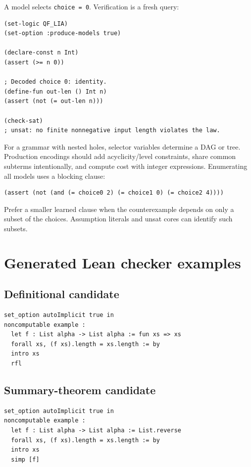 \documentclass[11pt,oneside]{article}
\newcommand{\code}[1]{\texttt{#1}}
\begin{document}
A model selects \code{choice = 0}. Verification is a fresh query:

\begin{lstlisting}[language=SMTLIB,caption={Universal verification as counterexample search}]
(set-logic QF_LIA)
(set-option :produce-models true)

(declare-const n Int)
(assert (>= n 0))

; Decoded choice 0: identity.
(define-fun out-len () Int n)
(assert (not (= out-len n)))

(check-sat)
; unsat: no finite nonnegative input length violates the law.
\end{lstlisting}

For a grammar with nested holes, selector variables determine a DAG or tree. Production
encodings should add acyclicity/level constraints, share common subterms intentionally,
and compute cost with integer expressions. Enumerating all models uses a blocking
clause:

\begin{lstlisting}[language=SMTLIB]
(assert (not (and (= choice0 2) (= choice1 0) (= choice2 4))))
\end{lstlisting}

Prefer a smaller learned clause when the counterexample depends on only a subset of the
choices. Assumption literals and unsat cores can identify such subsets.

\section{Generated Lean checker examples}
\label{app:lean}

\subsection{Definitional candidate}

\begin{lstlisting}[language=Lean]
set_option autoImplicit true in
noncomputable example :
  let f : List alpha -> List alpha := fun xs => xs
  forall xs, (f xs).length = xs.length := by
  intro xs
  rfl
\end{lstlisting}

\subsection{Summary-theorem candidate}

\begin{lstlisting}[language=Lean]
set_option autoImplicit true in
noncomputable example :
  let f : List alpha -> List alpha := List.reverse
  forall xs, (f xs).length = xs.length := by
  intro xs
  simp [f]
\end{lstlisting}
\end{document}
